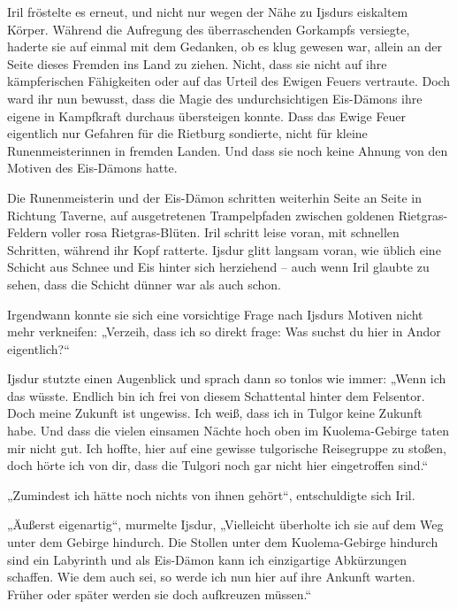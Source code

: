 Iril fröstelte es erneut, und nicht nur wegen der Nähe zu Ijsdurs eiskaltem Körper. Während die Aufregung des überraschenden Gorkampfs versiegte, haderte sie auf einmal mit dem Gedanken, ob es klug gewesen war, allein an der Seite dieses Fremden ins Land zu ziehen. Nicht, dass sie nicht auf ihre kämpferischen Fähigkeiten oder auf das Urteil des Ewigen Feuers vertraute. Doch ward ihr nun bewusst, dass die Magie des undurchsichtigen Eis-Dämons ihre eigene in Kampfkraft durchaus übersteigen konnte. Dass das Ewige Feuer eigentlich nur Gefahren für die Rietburg sondierte, nicht für kleine Runenmeisterinnen in fremden Landen. Und dass sie noch keine Ahnung von den Motiven des Eis-Dämons hatte.



\trennzeichen



Die Runenmeisterin und der Eis-Dämon schritten weiterhin Seite an Seite in Richtung Taverne, auf ausgetretenen Trampelpfaden zwischen goldenen Rietgras-Feldern voller rosa Rietgras-Blüten. Iril schritt leise voran, mit schnellen Schritten, während ihr Kopf ratterte. Ijsdur glitt langsam voran, wie üblich eine Schicht aus Schnee und Eis hinter sich herziehend – auch wenn Iril glaubte zu sehen, dass die Schicht dünner war als auch schon.

Irgendwann konnte sie sich eine vorsichtige Frage nach Ijsdurs Motiven nicht mehr verkneifen: „Verzeih, dass ich so direkt frage: Was suchst du hier in Andor eigentlich?“

Ijsdur stutzte einen Augenblick und sprach dann so tonlos wie immer: „Wenn ich das wüsste. Endlich bin ich frei von diesem Schattental hinter dem Felsentor. Doch meine Zukunft ist ungewiss. Ich weiß, dass ich in Tulgor keine Zukunft habe. Und dass die vielen einsamen Nächte hoch oben im Kuolema-Gebirge taten mir nicht gut. Ich hoffte, hier auf eine gewisse tulgorische Reisegruppe zu stoßen, doch hörte ich von dir, dass die Tulgori noch gar nicht hier eingetroffen sind.“

„Zumindest ich hätte noch nichts von ihnen gehört“, entschuldigte sich Iril.

„Äußerst eigenartig“, murmelte Ijsdur, „Vielleicht überholte ich sie auf dem Weg unter dem Gebirge hindurch. Die Stollen unter dem Kuolema-Gebirge hindurch sind ein Labyrinth und als Eis-Dämon kann ich einzigartige Abkürzungen schaffen. Wie dem auch sei, so werde ich nun hier auf ihre Ankunft warten. Früher oder später werden sie doch aufkreuzen müssen.“

